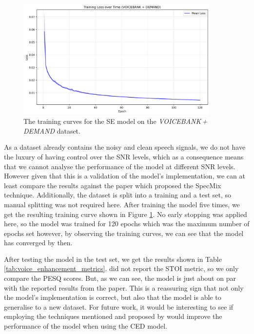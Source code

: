 \documentclass[logo,bsc,singlespacing,parskip,online]{infthesis}
\newcommand{\vbd}{\textit{VOICEBANK\,+\,DEMAND}\xspace}
\begin{document}
\begin{figure}[h]
   \centering
   \includegraphics[width=0.9\textwidth]{se-VOICEBANK-training-losses.png}
   \caption{The training curves for the SE model on the \vbd dataset.}
   \label{fig:se-voicebank-training-losses}
\end{figure}
As a dataset already contains the noisy and clean speech signals, we do not 
have the luxury of having control over the SNR levels, which as a 
consequence means that  we cannot analyse the performance of the model at different 
SNR levels. However given that this is a validation of the model's implementation, 
we can at least compare the results against the paper which proposed the SpecMix technique.
Additionally, the dataset is split into a training and a test set, so 
manual splitting was not required here. 
After training the model five times, we get the resulting training curve shown in Figure \ref{fig:se-voicebank-training-losses}.
No early stopping was applied here, so the model was trained for 120 epochs which was the maximum number of epochs set however,
by observing the training curves, we can see that the model has converged by then. 

After testing the model in the test set, we get the results shown in Table \ref{tab:voice_enhancement_metrics}.
\citet{kim_specmix_2021} did not report the STOI metric, so we only compare the PESQ scores.
But, as we can see, the model is just about on par with the reported results from the paper.
This is a reassuring sign that not only the model's implementation is correct, but also
that the model is able to generalise to a new dataset. For future work, it would 
be interesting to see if employing the techniques mentioned and proposed by \citet{kim_specmix_2021}
would improve the performance of the model when using the CED model. 
\end{document}
